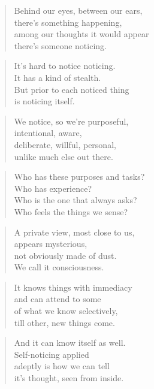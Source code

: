 \documentclass[10pt,a4paper]{article}
\begin{document}
\begin{multicols}{2}
\begin{verse}
Behind our eyes, between our ears,\\
there’s something happening,\\
among our thoughts it would appear\\
there’s someone noticing.
\end{verse}

\begin{verse}
It’s hard to notice noticing.\\
It has a kind of stealth.\\
But prior to each noticed thing\\
is noticing itself.
\end{verse}

\begin{verse}
We notice, so we’re purposeful,\\
intentional, aware,\\
deliberate, willful, personal,\\
unlike much else out there.
\end{verse}

\begin{verse}
Who has these purposes and tasks?\\
Who has experience?\\
Who is the one that always asks?\\
Who feels the things we sense?
\end{verse}

\begin{verse}
A private view, most close to us,\\
appears mysterious,\\
not obviously made of dust.\\
We call it consciousness.
\end{verse}

\begin{verse}
It knows things with immediacy\\
and can attend to some\\
of what we know selectively,\\
till other, new things come.
\end{verse}

\begin{verse}
And it can know itself as well.\\
Self-noticing applied\\
adeptly is how we can tell\\
it’s thought, seen from inside.
\end{verse}


\end{multicols}
\end{document}
